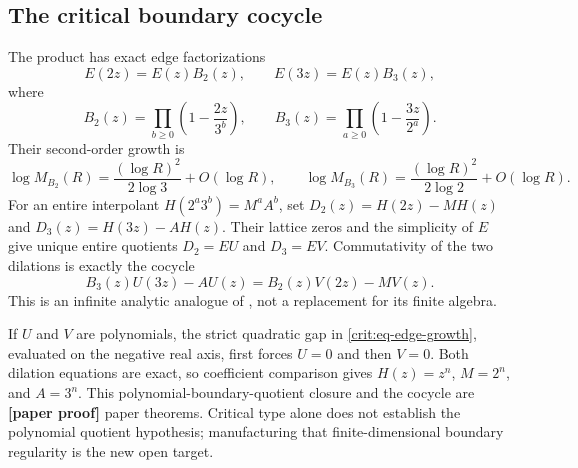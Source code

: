 \documentclass[11pt,oneside]{article}
\theoremstyle{definition}
\theoremstyle{remark}
\newcommand{\lean}[1]{\texttt{\detokenize{#1}}}
\newcommand{\statusnew}{\textcolor{newgreen}{\textbf{[paper proof]}}}
\begin{document}
\subsection{The critical boundary cocycle}
\label{crit:cocycle}

The product has exact edge factorizations
\begin{equation}
 E(2z)=E(z)B_2(z),\qquad E(3z)=E(z)B_3(z),
 \label{crit:eq-edge-factorization}
\end{equation}
where
\[
 B_2(z)=\prod_{b\ge0}\left(1-\frac{2z}{3^b}\right),\qquad
 B_3(z)=\prod_{a\ge0}\left(1-\frac{3z}{2^a}\right).
\]
Their second-order growth is
\begin{equation}
 \log M_{B_2}(R)=\frac{(\log R)^2}{2\log3}+O(\log R),\qquad
 \log M_{B_3}(R)=\frac{(\log R)^2}{2\log2}+O(\log R).
 \label{crit:eq-edge-growth}
\end{equation}
For an entire interpolant $H(2^a3^b)=M^aA^b$, set
$D_2(z)=H(2z)-MH(z)$ and $D_3(z)=H(3z)-AH(z)$.  Their lattice zeros and the simplicity of
$E$ give unique entire quotients $D_2=EU$ and $D_3=EV$.  Commutativity of the two dilations
is exactly the cocycle
\begin{equation}
 B_3(z)U(3z)-AU(z)=B_2(z)V(2z)-MV(z).
 \label{crit:eq-defect-cocycle}
\end{equation}
This is an infinite analytic analogue of \lean{BoundaryDilationDefect}, not a replacement
for its finite algebra.

If $U$ and $V$ are polynomials, the strict quadratic gap in
\eqref{crit:eq-edge-growth}, evaluated on the negative real axis, first forces $U=0$ and
then $V=0$.  Both dilation equations are exact, so coefficient comparison gives
$H(z)=z^n$, $M=2^n$, and $A=3^n$.  This polynomial-boundary-quotient closure and the cocycle
are \statusnew{} paper theorems.  Critical type alone does not establish the polynomial
quotient hypothesis; manufacturing that finite-dimensional boundary regularity is the new
open target.
\end{document}
